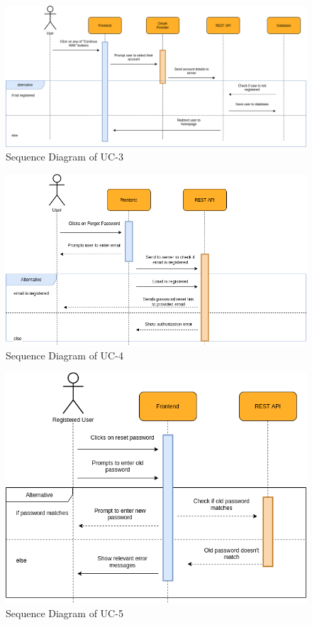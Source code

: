 \begin{figure}[H]
    \centering
    \includegraphics[scale=0.4]{./diagrams/sequence/seq-03.png}
    \caption{Sequence Diagram of UC-3}
    \label{fig:seq-03}
    
\end{figure}


\begin{figure}[H]
    \centering
    \includegraphics[scale=0.5]{./diagrams/sequence/seq-04.png}
    \caption{Sequence Diagram of UC-4}
    \label{fig:seq-04}
    
\end{figure}


\begin{figure}[H]
    \centering
    \includegraphics[scale=0.5]{./diagrams/sequence/seq-05.png}
    \caption{Sequence Diagram of UC-5}
    \label{fig:seq-05}
    
\end{figure}


